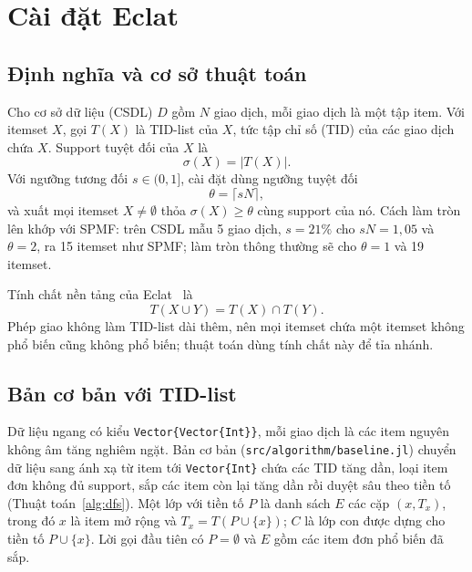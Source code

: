 \section{Cài đặt Eclat}
\label{sec:impl}

\subsection{Định nghĩa và cơ sở thuật toán}

Cho cơ sở dữ liệu (CSDL) $D$ gồm $N$ giao dịch, mỗi giao dịch là một tập item. Với itemset $X$, gọi $T(X)$ là
TID-list của $X$, tức tập chỉ số (TID) của các giao dịch chứa $X$. Support tuyệt đối của $X$ là
\begin{equation}
\sigma(X) = |T(X)|.
\label{eq:support}
\end{equation}
Với ngưỡng tương đối $s \in (0, 1]$, cài đặt dùng ngưỡng tuyệt đối
\begin{equation}
\theta = \lceil s N \rceil,
\label{eq:threshold}
\end{equation}
và xuất mọi itemset $X \neq \emptyset$ thỏa $\sigma(X) \geq \theta$ cùng support của nó. Cách làm tròn lên
khớp với SPMF: trên CSDL mẫu 5 giao dịch, $s = 21\%$ cho $sN = 1{,}05$ và $\theta = 2$, ra 15 itemset như SPMF;
làm tròn thông thường sẽ cho $\theta = 1$ và 19 itemset.

Tính chất nền tảng của Eclat~\cite{zaki2000scalable} là
\begin{equation}
T(X \cup Y) = T(X) \cap T(Y).
\label{eq:intersect}
\end{equation}
Phép giao không làm TID-list dài thêm, nên mọi itemset chứa một itemset không phổ biến cũng không phổ biến; thuật toán
dùng tính chất này để tỉa nhánh.

\subsection{Bản cơ bản với TID-list}

Dữ liệu ngang có kiểu \texttt{Vector\{Vector\{Int\}\}}, mỗi giao dịch là các item nguyên không âm tăng
nghiêm ngặt. Bản cơ bản (\texttt{src/algorithm/baseline.jl}) chuyển dữ liệu sang ánh xạ từ item tới
\texttt{Vector\{Int\}} chứa các TID tăng dần, loại item đơn không đủ support, sắp các item còn lại tăng dần
rồi duyệt sâu theo tiền tố (Thuật toán~\ref{alg:dfs}). Một lớp với tiền tố $P$ là danh sách $E$ các cặp
$(x, T_x)$, trong đó $x$ là item mở rộng và $T_x = T(P \cup \{x\})$; $C$ là lớp con được dựng cho tiền tố
$P \cup \{x\}$. Lời gọi đầu tiên có $P = \emptyset$ và $E$ gồm các item đơn phổ biến đã sắp.

